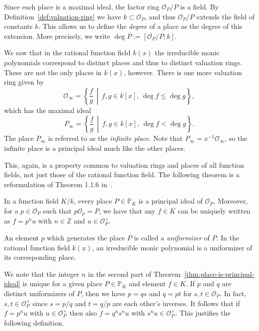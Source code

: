 Since each place is a maximal ideal, the factor ring \(\mathcal{O}_{P} / P\) is a field. By Definition~\ref{def:valuation-ring} we have \(k \subset \mathcal{O}_{P}\), and thus \(\mathcal{O}_{P} / P\) extends the field of constants \(k\). This allows us to define the \textit{degree} of a place as the degree of this extension. More precisely, we write \(\deg{P} := [\mathcal{O}_{P} / P : k]\). %

We saw that in the rational function field \(k(x)\) the irreducible monic polynomials correspond to distinct places and thus to distinct valuation rings. These are not the only places in \(k(x)\), however. There is one more valuation ring given by
\[\mathcal{O}_{\infty} = \left\{ \frac{f}{g} \,\middle|\, f,g \in k[x] ,\, \deg{f} \leq \deg{g} \right\},\]
which has the maximal ideal
\[P_{\infty} = \left\{ \frac{f}{g} \,\middle|\, f,g \in k[x] ,\, \deg{f} < \deg{g} \right\}.\]
The place \(P_{\infty}\) is referred to as the \textit{infinite place}. Note that \(P_{\infty} = x^{-1}\mathcal{O}_{\infty}\), so the infinite place is a principal ideal much like the other places.

This, again, is a property common to valuation rings and places of all function fields, not just those of the rational function field. The following theorem is a reformulation of Theorem 1.1.6 in~\cite{stichtenoth-2009-algebraic-function-fields}.

\begin{theorem}%
  \label{thm:place-is-principal-ideal}
  In a function field \(K / k\), every place \(P \in \mathbb{P}_{K}\) is a principal ideal of \(\mathcal{O}_{P}\). Moreover, for a \(p \in \mathcal{O}_{P}\) such that \(p\mathcal{O}_{p} = P\), we have that any \(f \in K\) can be uniquely written as \(f = p^{n}u\) with \(n \in \mathbb{Z}\) and \(u \in \mathcal{O}_{P}^{\times}\).
\end{theorem}

An element \(p\) which generates the place \(P\) is called a \textit{uniformizer} of \(P\). In the rational function field \(k(x)\), an irreducible monic polynomial is a uniformizer of its corresponding place.

We note that the integer \(n\) in the second part of Theorem~\ref{thm:place-is-principal-ideal} is unique for a given place \(P \in \mathbb{P}_{K}\) and element \(f \in K\). If \(p\) and \(q\) are distinct uniformizers of \(P\), then we have \(p = qs\) and \(q = pt\) for \(s,t \in \mathcal{O}_{P}\). In fact, \(s,t \in \mathcal{O}_{P}^{\times}\) since \(s = p/q\) and \(t = q/p\) are each other's inverses. It follows that if \(f = p^{n}u\) with \(u \in \mathcal{O}_{P}^{\times}\) then also \(f = q^{n}s^{n}u\) with \(s^{n}u \in \mathcal{O}_{P}^{\times}\). This justifies the following definition.


